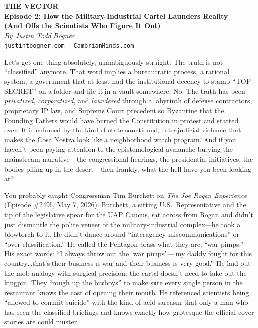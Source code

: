 \documentclass[11pt,a4paper]{article}
\begin{document}
\begin{center}
    {\LARGE\bfseries\color{vectorBlue} THE VECTOR} \\
    \vspace{0.2cm}
    {\large\bfseries\color{accentRust} Episode 2: How the Military-Industrial Cartel Launders Reality \\ (And Offs the Scientists Who Figure It Out)} \\
    \vspace{0.4cm}
    {\small\itshape By Justin Todd Bogner} \\
    \vspace{0.1cm}
    {\small\texttt{justintbogner.com} \,|\, \texttt{CambrianMinds.com}}
    \vspace{0.6cm}
\end{center}

Let's get one thing absolutely, unambiguously straight: The truth is not ``classified'' anymore. That word implies a bureaucratic process, a rational system, a government that at least had the institutional decency to stamp ``TOP SECRET'' on a folder and file it in a vault somewhere. No. The truth has been \textit{privatized}, \textit{corporatized}, and \textit{laundered} through a labyrinth of defense contractors, proprietary IP law, and Supreme Court precedent so Byzantine that the Founding Fathers would have burned the Constitution in protest and started over. It is enforced by the kind of state-sanctioned, extrajudicial violence that makes the Cosa Nostra look like a neighborhood watch program. And if you haven't been paying attention to the epistemological avalanche burying the mainstream narrative---the congressional hearings, the presidential initiatives, the bodies piling up in the desert---then frankly, what the hell have you been looking at?

You probably caught Congressman Tim Burchett on \textit{The Joe Rogan Experience} (Episode \#2495, May 7, 2026). Burchett, a sitting U.S.\ Representative and the tip of the legislative spear for the UAP Caucus, sat across from Rogan and didn't just dismantle the polite veneer of the military-industrial complex---he took a blowtorch to it. He didn't dance around ``interagency miscommunications'' or ``over-classification.'' He called the Pentagon brass what they are: ``war pimps.'' His exact words: ``I always throw out the `war pimps'\,---\,my daddy fought for this country\ldots that's their business is war and their business is very good.'' He laid out the mob analogy with surgical precision: the cartel doesn't need to take out the kingpin. They ``rough up the busboys'' to make sure every single person in the restaurant knows the cost of opening their mouth. He referenced scientists being ``allowed to commit suicide'' with the kind of acid sarcasm that only a man who has seen the classified briefings and knows exactly how grotesque the official cover stories are could muster.
\end{document}
